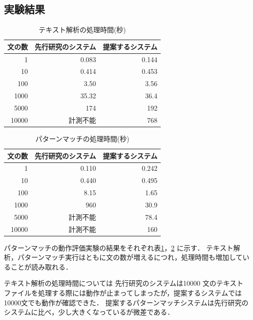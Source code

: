\documentclass{FITpaper}
\begin{document}
\subsection{実験結果}

\begin{table}[htbp]
  \centering
    \caption{テキスト解析の処理時間(秒)}
    \label{tbl:convert_time}
    \begin{tabular}{|r||r|r|}  
      \hline
      文の数 &先行研究のシステム& 提案するシステム \\\hline \hline
      1 & 0.083&0.144\\\hline
      10 & 0.414&0.453 \\\hline
      100 & 3.50 &3.56\\ \hline
      1000 & 35.32&36.4 \\\hline
      5000 &  174&192\\\hline
      10000 &  計測不能&768\\ \hline
    \end{tabular}
  \end{table}
\begin{table}[htbp]
  \centering
    \caption{パターンマッチの処理時間(秒)}
    \label{tbl:matching_time}
    \begin{tabular}{|r||r|r|}  
      \hline
      文の数 & 先行研究のシステム& 提案するシステム\\ \hline \hline
      1 & 0.110&0.242\\\hline
      10 & 0.440 &0.495\\\hline
      100 & 8.15&1.65\\ \hline
      1000 & 960 &30.9 \\\hline
      5000 & 計測不能 &78.4\\\hline
      10000 & 計測不能 &160\\ \hline
    \end{tabular}
  \end{table}


  パターンマッチの動作評価実験の結果をそれぞれ表\ref{tbl:convert_time}，\ref{tbl:matching_time} に示す．
  テキスト解析，パターンマッチ実行はともに文の数が増えるにつれ，処理時間も増加していることが読み取れる．

  
  テキスト解析の処理時間については
  先行研究のシステムは10000 文のテキストファイルを処理する際には動作が止まってしまったが，提案するシステムでは10000文でも動作が確認できた．
  提案するパターンマッチシステムは先行研究のシステムに比べ，少し大きくなっているが微差である．
 
\end{document}
